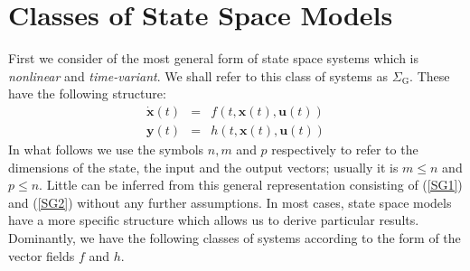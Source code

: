 \documentclass[a4paper,10pt,oneside]{book}
\begin{document}
\chapter{Classes of State Space Models}\label{classesOfModels}
First we consider of the most general form of state space systems which is \emph{nonlinear} and \emph{time-variant}. We shall refer to this class of systems as $\Sigma_{\text{G}}$. These have the following structure:
\begin{eqnarray}
 \dot{\mathbf{x}}(t) &=& f(t,\mathbf{x}(t),\mathbf{u}(t))\label{SG1}\\
 \mathbf{y}(t) &=& h(t,\mathbf{x}(t),\mathbf{u}(t))\label{SG2}
\end{eqnarray}
In what follows we use the symbols $n,m$ and $p$ respectively to refer to the dimensions of the state, the input and the output vectors; usually it is $m\leq n$ and $p\leq n$. Little can be inferred from this general representation consisting of (\ref{SG1}) and (\ref{SG2}) without any further assumptions. In most cases, state space models have a more specific structure which allows us to derive particular results. Dominantly, we have the following classes of systems according to the form of the vector fields $f$ and $h$.
\end{document}
